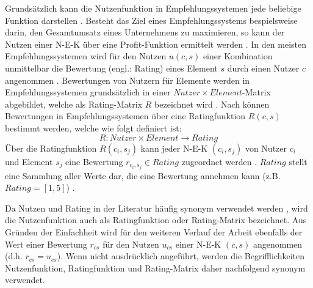 Grundsätzlich kann die Nutzenfunktion in Empfehlungssystemen jede beliebige Funktion darstellen \cite[S. 735]{adomavicius:inproceedings}.
Besteht das Ziel eines Empfehlungssystems bespielsweise darin, den Gesamtumsatz eines Unternehmens zu maximieren, so kann der Nutzen einer \ac{N-E-K} über eine Profit-Funktion ermittelt werden \cite[S. 735]{adomavicius:inproceedings}\cite[S. 896]{adomavicius:article}\cite[S. 11]{recommenderSystems:2016}\cite[S. 1]{jannach:article}.
In den meisten Empfehlungssystemen wird für den Nutzen $u(c,s)$ einer Kombination unmittelbar die Bewertung (engl.: Rating) eines Element $s$ durch einen Nutzer $c$ angenommen \cite[S. 735]{adomavicius:inproceedings}\cite[S. 1]{dekhtyar:misc}\cite[S. 3880]{nilashi:article}\cite[S. 11]{recommenderSystems:2016}\cite[S. 9]{ricci:inbook}.
Bewertungen von Nutzern für Elemente werden in Empfehlungssystemen grundsätzlich in einer $Nutzer \times Element$-Matrix abgebildet, welche als Rating-Matrix $R$ bezeichnet wird \cite[S. 87]{ekstrand:article}.
Nach \textcite[S. 48f.]{adomavicius:inproceedings:2} können Bewertungen in Empfehlungssystemen über eine Ratingfunktion $R(c,s)$ bestimmt werden, welche wie folgt definiert ist:
\begin{equation}\label{eq10}
    R: Nutzer \times Element \rightarrow Rating
\end{equation}
Über die Ratingfunktion $R(c_{i},s_{j})$ kann jeder \ac{N-E-K} $(c_{i},s_{j})$ von Nutzer $c_{i}$ und Element $s_{j}$ eine Bewertung $r_{c_{i},s_{j}} \in Rating$ zugeordnet werden \cite[S. 42]{ning:inbook}.
$Rating$ stellt eine Sammlung aller Werte dar, die eine Bewertung annehmen kann (z.B. $Rating = [1,5]$) \cite[S. 41]{ning:inbook}.

Da Nutzen und Rating in der Literatur häufig synonym verwendet werden \cite[S. 11]{recommenderSystems:2016}, wird die Nutzenfunktion auch als Ratingfunktion \cite[S. 49]{adomavicius:inproceedings:2} oder Rating-Matrix \cite[S. 87]{ekstrand:article} bezeichnet.
Aus Gründen der Einfachheit wird für den weiteren Verlauf der Arbeit ebenfalls der Wert einer Bewertung $r_{cs}$ für den Nutzen $u_{cs}$ einer \ac{N-E-K} $(c,s)$ angenommen (d.h. $r_{cs} = u_{cs}$).
Wenn nicht ausdrücklich angeführt, werden die Begrifflichkeiten Nutzenfunktion, Ratingfunktion und Rating-Matrix daher nachfolgend synonym verwendet.

